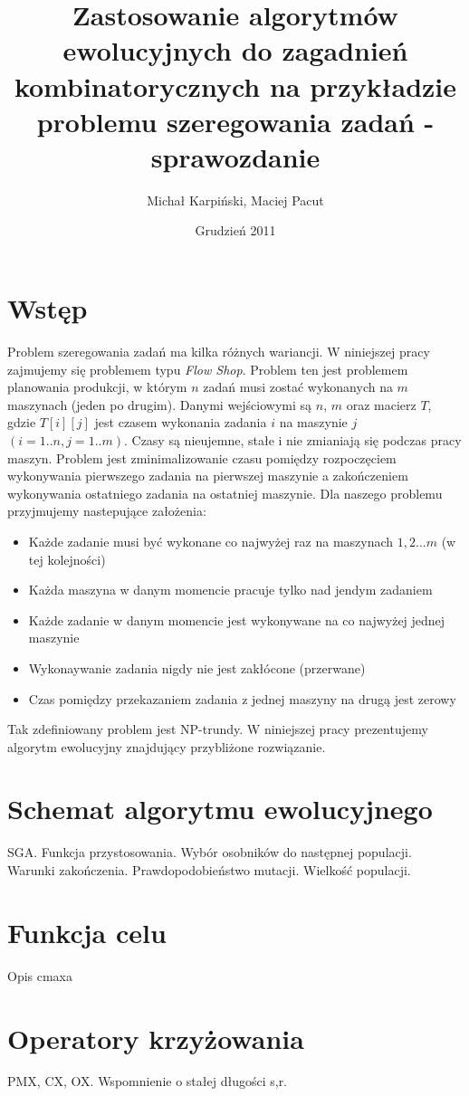 \documentclass[12pt]{article}
\title{Zastosowanie algorytmów ewolucyjnych do zagadnień
  kombinatorycznych na przykładzie problemu szeregowania zadań - sprawozdanie}
\author{Michał Karpiński, Maciej Pacut}
\date{Grudzień 2011}
\begin{document}
  \maketitle
\section{Wstęp}
Problem szeregowania zadań ma kilka różnych wariancji. W niniejszej pracy zajmujemy się problemem typu {\em Flow Shop}.
Problem ten jest problemem planowania produkcji, w którym $n$ zadań musi zostać wykonanych na $m$ maszynach (jeden po drugim).
Danymi wejściowymi są $n$, $m$ oraz macierz $T$, gdzie $T[i][j]$ jest czasem wykonania zadania $i$ na maszynie $j$ $(i = 1..n, j = 1..m )$.
Czasy są nieujemne, stałe i nie zmianiają się podczas pracy maszyn. Problem jest zminimalizowanie czasu 
pomiędzy rozpoczęciem wykonywania pierwszego zadania na pierwszej maszynie a zakończeniem wykonywania ostatniego zadania na ostatniej maszynie.
Dla naszego problemu przyjmujemy nastepujące założenia:

\begin{itemize}
  \item Każde zadanie musi być wykonane co najwyżej raz na maszynach $1, 2 ... m$ (w tej kolejności)
  \item Każda maszyna w danym momencie pracuje tylko nad jendym zadaniem
  \item Każde zadanie w danym momencie jest wykonywane na co najwyżej jednej maszynie
  \item Wykonaywanie zadania nigdy nie jest zakłócone (przerwane)
  \item Czas pomiędzy przekazaniem zadania z jednej maszyny na drugą jest zerowy
\end{itemize}

Tak zdefiniowany problem jest NP-trundy. W niniejszej pracy prezentujemy algorytm ewolucyjny znajdujący przybliżone rozwiązanie.

\section{Schemat algorytmu ewolucyjnego}
SGA. Funkcja przystosowania. Wybór osobników do następnej populacji.
Warunki zakończenia. Prawdopodobieństwo mutacji. Wielkość populacji.
\section{Funkcja celu}
Opis cmaxa
\section{Operatory krzyżowania}
PMX, CX, OX. Wspomnienie o stałej długości s,r.
\end{document}
